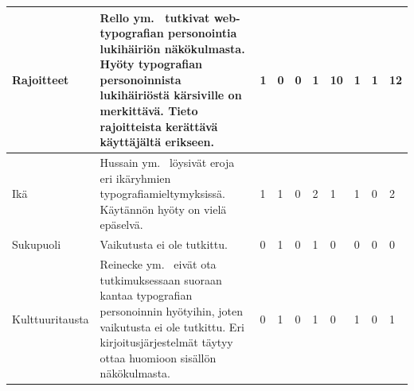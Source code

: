 \documentclass[finnish, 12pt, a4paper, elec, utf8, a-1b, online]{aaltothesis}
\begin{document}
{\begin{longtable}{p{2.5cm}|p{6cm}|p{0.5cm}p{0.5cm}p{0.5cm}|p{0.5cm}|p{0.5cm}p{0.5cm}p{0.5cm}|p{0.5cm}|}
    \midrule
    Rajoitteet                             & Rello ym.~\cite{10.1145/2207016.2207048} tutkivat web-typografian personointia lukihäiriön näkökulmasta. Hyöty typografian personoinnista lukihäiriöstä kärsiville on merkittävä. Tieto rajoitteista kerättävä käyttäjältä erikseen.                          & 1                                          & 0                                   & 0                                      & 1                            & 10                                              & 1                                         & 1                                         & 12                           \\
    \midrule
    Ikä                                    & Hussain ym.~\cite{hussain_sohaib_ahmed_qasim_khan_2011} löysivät eroja eri ikäryhmien typografiamieltymyksissä. Käytännön hyöty on vielä epäselvä.                                                                                                            & 1                                          & 1                                   & 0                                      & 2                            & 1                                               & 1                                         & 0                                         & 2                            \\
    \midrule
    Sukupuoli                              & Vaikutusta ei ole tutkittu.                                                                                                                                                                                                                                   & 0                                          & 1                                   & 0                                      & 1                            & 0                                               & 0                                         & 0                                         & 0                            \\
    \midrule
    Kulttuuritausta                        & Reinecke ym.~\cite{10.1145/2556288.2557052} eivät ota tutkimuksessaan suoraan kantaa typografian personoinnin hyötyihin, joten vaikutusta ei ole tutkittu. Eri kirjoitusjärjestelmät täytyy ottaa huomioon sisällön näkökulmasta.                             & 0                                          & 1                                   & 0                                      & 1                            & 0                                               & 1                                         & 0                                         & 1                            \\

\end{longtable}}
\end{document}
